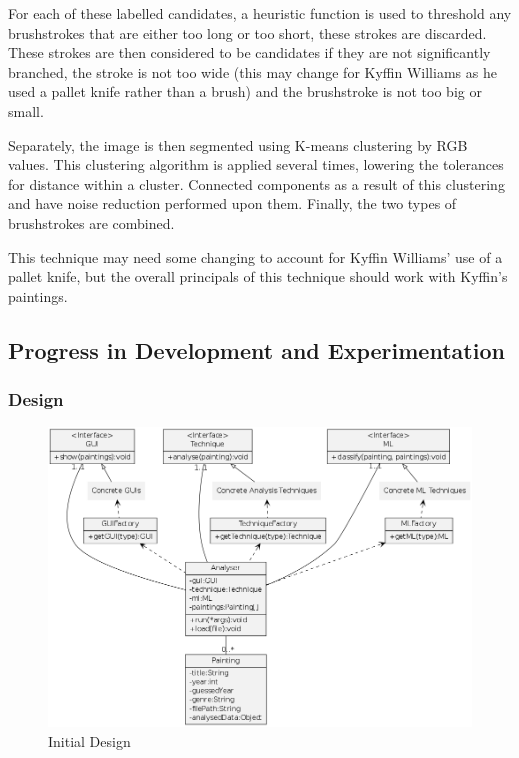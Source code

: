 \documentclass[11pt,fleqn,twoside]{article}
\begin{document}
For each of these labelled candidates, a heuristic function is used to threshold any brushstrokes 
that are either too long or too short, these strokes are discarded. These strokes are then
considered to be candidates if they are not significantly branched, the stroke is not too wide 
(this may change for Kyffin Williams as he used a pallet knife rather than a brush) and the 
brushstroke is not too big or small.

Separately, the image is then segmented using K-means clustering by RGB values. This clustering 
algorithm is applied several times, lowering the tolerances for distance within a cluster. 
Connected components as a result of this clustering and have noise reduction performed upon them.
Finally, the two types of brushstrokes are combined.

This technique may need some changing to account for Kyffin Williams' use of a pallet knife, but
the overall principals of this technique should work with Kyffin's paintings.

\clearpage
\subsection{Progress in Development and Experimentation}

\subsubsection{Design}
\begin{figure}[H]
\includegraphics[scale=0.5]{img/design.png}
\caption{Initial Design}
\label{fig:init-class}
\end{figure}
\end{document}
